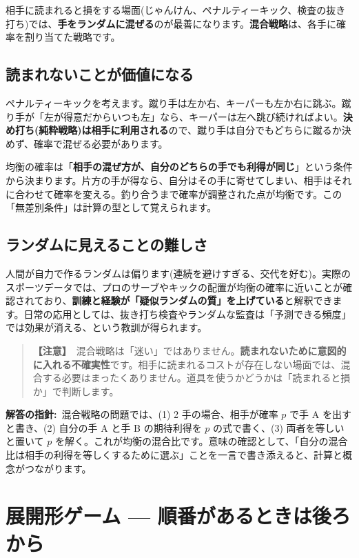\documentclass{article}
\begin{document}
相手に読まれると損をする場面(じゃんけん、ペナルティーキック、検査の抜き打ち)では、\textbf{手をランダムに混ぜる}のが最善になります。\textbf{混合戦略}は、各手に確率を割り当てた戦略です。

\subsection{読まれないことが価値になる}

ペナルティーキックを考えます。蹴り手は左か右、キーパーも左か右に跳ぶ。蹴り手が「左が得意だからいつも左」なら、キーパーは左へ跳び続ければよい。\textbf{決め打ち(純粋戦略)は相手に利用される}ので、蹴り手は自分でもどちらに蹴るか決めず、確率で混ぜる必要があります。

均衡の確率は「\textbf{相手の混ぜ方が、自分のどちらの手でも利得が同じ}」という条件から決まります。片方の手が得なら、自分はその手に寄せてしまい、相手はそれに合わせて確率を変える。釣り合うまで確率が調整された点が均衡です。この「無差別条件」は計算の型として覚えられます。

\subsection{ランダムに見えることの難しさ}

人間が自力で作るランダムは偏ります(連続を避けすぎる、交代を好む)。実際のスポーツデータでは、プロのサーブやキックの配置が均衡の確率に近いことが確認されており、\textbf{訓練と経験が「疑似ランダムの質」を上げている}と解釈できます。日常の応用としては、抜き打ち検査やランダムな監査は「予測できる頻度」では効果が消える、という教訓が得られます。

\begin{quote}
\textbf{【注意】}\ 混合戦略は「迷い」ではありません。\textbf{読まれないために意図的に入れる不確実性}です。相手に読まれるコストが存在しない場面では、混合する必要はまったくありません。道具を使うかどうかは「読まれると損か」で判断します。
\end{quote}

\textbf{解答の指針:}\ 混合戦略の問題では、(1) 2 手の場合、相手が確率 \( p \) で手 A を出すと書き、(2) 自分の手 A と手 B の期待利得を \( p \) の式で書く、(3) 両者を等しいと置いて \( p \) を解く。これが均衡の混合比です。意味の確認として、「自分の混合比は相手の利得を等しくするために選ぶ」ことを一言で書き添えると、計算と概念がつながります。

\section{展開形ゲーム — 順番があるときは後ろから}
\end{document}
